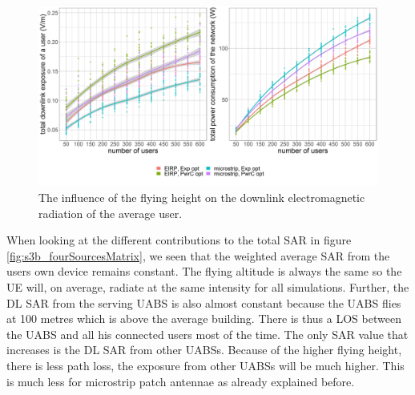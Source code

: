 \begin{figure}[h!]
  \includegraphics[width=\textwidth]{../results/s3/uvsdlAndPc.png}
  \caption{The influence of the flying height on the downlink electromagnetic radiation of the average user.}
  \label{fig:s3b_dlAndPC}
\end{figure}

When looking at the different contributions to the total \gls{SAR} in figure \ref{fig:s3b_fourSourcesMatrix}, we seen that the weighted average 
\gls{SAR} from the users own device remains constant. The flying altitude is always the same so the
 \gls{UE} will, on average, radiate at the same intensity for all simulations.
 Further, the \gls{DL} \gls{SAR} from the serving \gls{UABS} is also almost constant  because the \gls{UABS} flies at 100 metres which is
above the average building. There is thus a \gls{LOS} between the \gls{UABS} and all his connected users most of the time.
The only \gls{SAR} value that increases is the \gls{DL} \gls{SAR} from other \gls{UABS}s. Because of the higher flying height, there is less path loss, the 
exposure from other \gls{UABS}s will be much higher. This is much less for microstrip patch antennae as already explained before.


